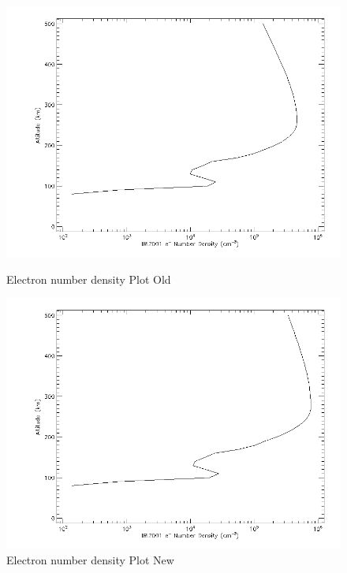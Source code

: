 

\begin{figure}[!htbp]
  \centering
  \begin{minipage}[b]{0.7\textwidth}
    \includegraphics[width=\textwidth]{images/E_number_density_plot1}
    \caption{Electron number density Plot Old}
    \label{fig:ass2Plot1}
  \end{minipage}
  \vfill
  \begin{minipage}[b]{0.7\textwidth}
    \includegraphics[width=\textwidth]{images/E_number_density_plot2}
    \caption{Electron number density Plot New}
    \label{fig:ass2Plot2}
  \end{minipage}
\end{figure}

